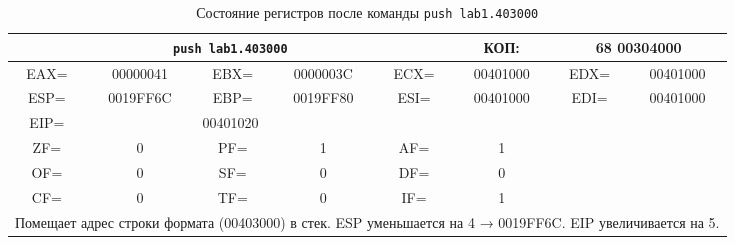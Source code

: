 \begin{table}[H]
    \centering
    \caption{Состояние регистров после команды \texttt{push lab1.403000}}
    \label{tab:after_push_fmt}
    \small
    \renewcommand{\arraystretch}{1.3}
    \begin{tabular}{|c|c|c|c|c|c|c|c|}
    \hline
    \multicolumn{5}{|c|}{\cellcolor{green!40}\textbf{\texttt{push lab1.403000}}} & \cellcolor{green!20} КОП: & \multicolumn{2}{c|}{\cellcolor{green!20} 68 00304000} \\
    \hline
    \cellcolor{blue!30} EAX= & 00000041 & \cellcolor{blue!30} EBX= & 0000003C & \cellcolor{blue!30} ECX= & 00401000 & \cellcolor{blue!30} EDX= & 00401000 \\
    \hline
    \cellcolor{blue!30} ESP= & \cellcolor{red!70} 0019FF6C & \cellcolor{blue!30} EBP= & 0019FF80 & \cellcolor{blue!30} ESI= & 00401000 & \cellcolor{blue!30} EDI= & 00401000 \\
    \hline
    \cellcolor{blue!30} EIP= & \multicolumn{3}{c|}{\cellcolor{red!70} 00401020} & \multicolumn{4}{c|}{} \\
    \hline
    \cellcolor{pink} ZF= & 0 & \cellcolor{pink} PF= & 1 & \cellcolor{pink} AF= & 1 & \multicolumn{2}{c|}{\cellcolor{gray!50}} \\
    \cline{1-6}
    \cellcolor{pink} OF= & 0 & \cellcolor{pink} SF= & 0 & \cellcolor{pink} DF= & 0 & \multicolumn{2}{c|}{\cellcolor{gray!50}} \\
    \cline{1-6}
    \cellcolor{pink} CF= & 0 & \cellcolor{pink} TF= & 0 & \cellcolor{pink} IF= & 1 & \multicolumn{2}{c|}{\cellcolor{gray!50}} \\
    \hline
    \multicolumn{8}{|p{14cm}|}{Помещает адрес строки формата (00403000) в стек. ESP уменьшается на 4 → 0019FF6C. EIP увеличивается на 5.} \\
    \hline
    \end{tabular}
\end{table}


